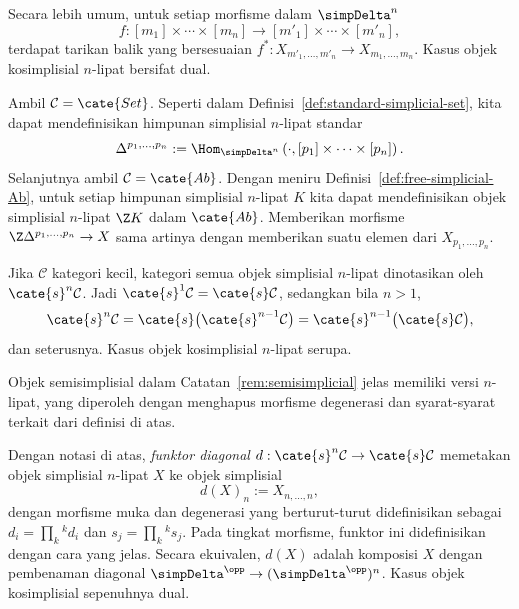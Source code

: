 Secara lebih umum, untuk setiap morfisme dalam $\simpDelta^n$
\[ f:[m_1]\times\cdots\times[m_n]\to[m'_1]\times\cdots\times[m'_n], \]
terdapat tarikan balik yang bersesuaian
$f^*:X_{m'_1,\ldots,m'_n}\to X_{m_1,\ldots,m_n}$. Kasus objek
kosimplisial $n$-lipat bersifat dual.

\begin{example}\label{eg:standard-n-fold-sSet}
	Ambil $\mathcal{C}=\cate{Set}$. Seperti dalam
	Definisi~\ref{def:standard-simplicial-set}, kita dapat mendefinisikan
	himpunan simplisial $n$-lipat standar
	\[ \Delta^{p_1, \ldots, p_n} := \Hom_{\simpDelta^n}\left(\cdot, [p_1] \times \cdots \times [p_n] \right). \]
	Selanjutnya ambil $\mathcal{C}=\cate{Ab}$. Dengan meniru
	Definisi~\ref{def:free-simplicial-Ab}, untuk setiap himpunan simplisial
	$n$-lipat $K$ kita dapat mendefinisikan objek simplisial $n$-lipat
	$\Z K$ dalam $\cate{Ab}$. Memberikan morfisme
	$\Z\Delta^{p_1,\ldots,p_n}\to X$ sama artinya dengan memberikan suatu
	elemen dari $X_{p_1,\ldots,p_n}$.
\end{example}

Jika $\mathcal{C}$ kategori kecil, kategori semua objek simplisial
$n$-lipat dinotasikan oleh $\cate{s}^n\mathcal{C}$. Jadi
$\cate{s}^1\mathcal{C}=\cate{s}\mathcal{C}$, sedangkan bila $n>1$,
\[ \cate{s}^n\mathcal{C}=\cate{s}\bigl(\cate{s}^{n-1}\mathcal{C}\bigr)
=\cate{s}^{n-1}\bigl(\cate{s}\mathcal{C}\bigr), \]
dan seterusnya. Kasus objek kosimplisial $n$-lipat serupa.

Objek semisimplisial dalam Catatan~\ref{rem:semisimplicial} jelas memiliki
versi $n$-lipat, yang diperoleh dengan menghapus morfisme degenerasi dan
syarat-syarat terkait dari definisi di atas.

\begin{definition}\label{def:bisimplicial-diagonal}
	Dengan notasi di atas, \emph{funktor diagonal}
	$d:\cate{s}^n\mathcal{C}\to\cate{s}\mathcal{C}$ memetakan objek
	simplisial $n$-lipat $X$ ke objek simplisial
	\[ d(X)_n := X_{n, \ldots, n}, \]
	dengan morfisme muka dan degenerasi yang berturut-turut didefinisikan
	sebagai $d_i=\prod_k{}^kd_i$ dan $s_j=\prod_k{}^ks_j$. Pada tingkat
	morfisme, funktor ini didefinisikan dengan cara yang jelas. Secara
	ekuivalen, $d(X)$ adalah komposisi $X$ dengan pembenaman diagonal
	$\simpDelta^{\opp}\to(\simpDelta^{\opp})^n$. Kasus objek kosimplisial
	sepenuhnya dual.
\end{definition}


